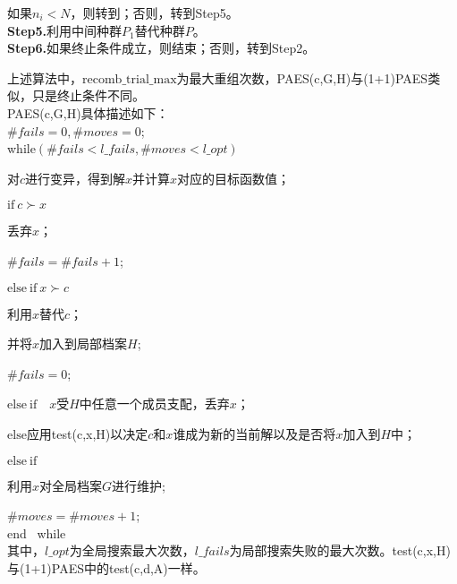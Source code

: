             \par
            如果$n_i < N$，则转到；否则，转到Step5。\\
            \textbf{Step5.}利用中间种群$P_1$替代种群$P$。\\
            \textbf{Step6.}如果终止条件成立，则结束；否则，转到Step2。
            \par
            上述算法中，$\mathrm{recomb\_trial\_max}$为最大重组次数，PAES(c,G,H)与(1+1)PAES类似，只是终止条件不同。\\
            PAES(c,G,H)具体描述如下：\\
            $\#fails=0,\#moves=0$;\\
            while$(\#fails<l\_fails,\#moves<l\_opt)$\par
            对$c$进行变异，得到解$x$并计算$x$对应的目标函数值；\par
            $\mathrm{if}\ c \succ x$\par
            \qquad 丢弃$x$；\par
            \qquad $\#fails=\#fails+1$;\par
            $\mathrm{else\ if}\ x\succ c$\par
            \qquad 利用$x$替代$c$；\par
            \qquad 并将$x$加入到局部档案$H$;\par
            \qquad $\# fails=0$;\par
            $\mathrm{else\ if}\quad x$受$H$中任意一个成员支配，丢弃$x$；\par
            $\mathrm{else}$\quad 应用test(c,x,H)以决定$c$和$x$谁成为新的当前解以及是否将$x$加入到$H$中；\par
            $\mathrm{else\ if}$\par
            利用$x$对全局档案$G$进行维护;\par
            $\#moves=\#moves+1$;\\
            end \ while\\
            其中，$l\_opt$为全局搜索最大次数，$l\_fails$为局部搜索失败的最大次数。test(c,x,H)与(1+1)PAES中的test(c,d,A)一样。
